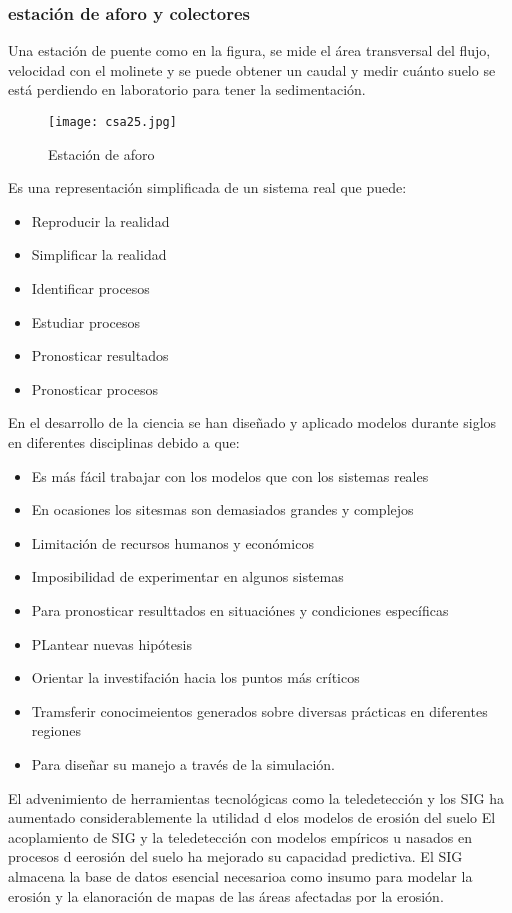     \subsubsection{estación de aforo y colectores}
    Una estación de puente como en la figura, se mide el área transversal del flujo,
    velocidad con el molinete y se puede obtener un caudal y medir cuánto suelo se está perdiendo en 
    laboratorio para tener la sedimentación. 
    \begin{figure}[h!]
    \centering
      \texttt{[image: csa25.jpg]}
      \caption{Estación de aforo}
      \label{csa25}
    \end{figure}
    \begin{definition}[Modelo]
        Es una representación simplificada de un sistema real que puede:
        \begin{itemize}
            \item Reproducir la realidad
            \item Simplificar la realidad
            \item Identificar procesos
            \item Estudiar procesos
            \item Pronosticar resultados
            \item Pronosticar procesos
        \end{itemize}
    \end{definition}
    En el desarrollo de la ciencia se han diseñado y aplicado modelos durante siglos en diferentes disciplinas debido a que:
    \begin{itemize}
        \item Es más fácil trabajar con los modelos que con los sistemas reales
        \item En ocasiones los sitesmas son demasiados grandes y complejos
        \item Limitación de recursos humanos y económicos
        \item Imposibilidad de experimentar en algunos sistemas
        \item Para pronosticar resulttados en situaciónes y condiciones específicas
        \item PLantear nuevas hipótesis
        \item Orientar la investifación hacia los puntos más críticos
        \item Tramsferir conocimeientos generados sobre diversas prácticas en diferentes regiones
        \item Para diseñar su manejo a través de la simulación.
    \end{itemize}
    El advenimiento de herramientas tecnológicas como la teledetección y los SIG ha aumentado considerablemente la utilidad d elos modelos de erosión del suelo
    El acoplamiento de SIG y la teledetección con modelos empíricos u nasados en procesos d eerosión del suelo ha mejorado su capacidad predictiva. El SIG almacena la base de datos esencial necesarioa como insumo para modelar la erosión y la elanoración de mapas de las áreas afectadas por la erosión.
